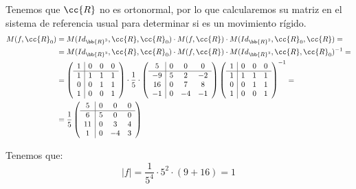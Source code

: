 \begin{ejercicio}
    Tenemos que $\cc{R}$ no es ortonormal, por lo que calcularemos su matriz en el sistema de referencia usual para determinar si es un movimiento rígido.
    \begin{align*}
        M(f, \cc{R}_0) &= M(Id_{\bb{R}^3}, \cc{R}, \cc{R}_0) \cdot M(f, \cc{R}) \cdot M(Id_{\bb{R}^3}, \cc{R}_0, \cc{R}) =\\
        &= M(Id_{\bb{R}^3}, \cc{R}, \cc{R}_0) \cdot M(f, \cc{R}) \cdot M(Id_{\bb{R}^3}, \cc{R}, \cc{R}_0)^{-1} =\\
        &=\left(
        \begin{array}{c|ccc}
            1 & 0 & 0 & 0 \\ \hline
            1 & 1 & 1 & 1 \\
            0 & 0 & 1 & 1 \\
            1 & 0 & 0 & 1
        \end{array}
        \right) \cdot \frac{1}{5}\cdot 
        \left(
        \begin{array}{c|ccc}
            5 & 0 & 0 & 0 \\ \hline
            -9 & 5 & 2 & -2 \\
            16 & 0 & 7 & 8 \\
            -1 & 0 & -4 & -1
        \end{array}
        \right)\left(
        \begin{array}{c|ccc}
            1 & 0 & 0 & 0 \\ \hline
            1 & 1 & 1 & 1 \\
            0 & 0 & 1 & 1 \\
            1 & 0 & 0 & 1
        \end{array}
        \right)^{-1}
        =\\
        &= \frac{1}{5}\left(
        \begin{array}{c|ccc}
            5 & 0 & 0 & 0 \\ \hline
            6 & 5 & 0 & 0 \\
            11 & 0 & 3 & 4 \\
            1 & 0 & -4 & 3
        \end{array}
        \right)
    \end{align*}

    Tenemos que:
    \begin{equation*}
        |f| = \frac{1}{5^4} \cdot 5^2 \cdot (9 + 16) = 1
    \end{equation*}


\end{ejercicio}
